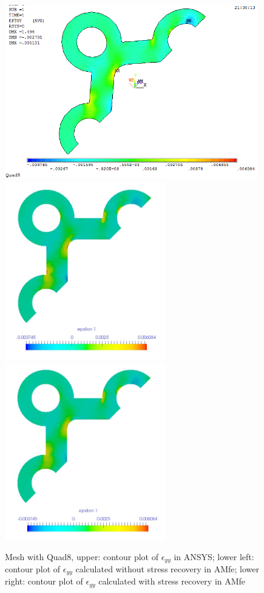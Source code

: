\begin{figure}[htbp]
	\begin{center}
		\includegraphics[width=11cm,clip]{Quad8_Eyy.png} 	
		\includegraphics[width=7cm,clip]{Quad8_Eyy_PD.png} 			
		\includegraphics[width=7cm,clip]{Quad8_Eyy_P.png} 		
		\caption{Mesh with Quad8, upper: contour plot of $\epsilon_{yy}$ in ANSYS; lower left: contour plot of $\epsilon_{yy}$ calculated without stress recovery in AMfe; lower right: contour plot of $\epsilon_{yy}$ calculated with stress recovery in AMfe} \label{fig: Quad8_Eyy}
	\end{center}
\end{figure}
\clearpage 

